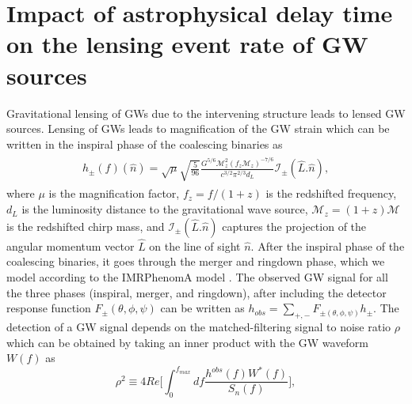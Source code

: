 \documentclass[a4paper,useAMS,usenatbib]{mnras}
\begin{document}
\section{Impact of astrophysical delay time on the lensing event rate of GW sources}
Gravitational lensing of GWs due to the intervening structure leads to lensed GW sources. Lensing of GWs leads to magnification of the GW strain which can be written  {in the inspiral phase of the coalescing binaries} as \citep{1987thyg.book.....H, Cutler:1994ys,Poisson:1995ef,maggiore2008gravitational}
\begin{align}\label{lens-1}
    \begin{split}
       h_{\pm}(f) (\hat n)= \sqrt{\mu}\sqrt{\frac{5}{96}}\frac{G^{5/6}\mathcal{M}_z^2 (f_z\mathcal{M}_z)^{-7/6}}{c^{3/2}\pi^{2/3}d_L}\mathcal{I}_{\pm} (\hat L.\hat n), 
           \end{split}
\end{align}
where $\mu$ is the magnification factor, $f_z= f/(1+z)$ is the redshifted frequency, $d_L$ is the luminosity distance to the gravitational wave source, $\mathcal{M}_z= (1+z)\mathcal{M}$ is the redshifted chirp mass, and  $\mathcal{I}_{\pm} (\hat L.\hat n)$ captures the projection of the angular momentum vector $\hat L$ on the line of sight $\hat n$.  {After the inspiral phase of the coalescing binaries, it goes through the merger and ringdown phase, which we model according to the IMRPhenomA model \citep{Ajith:2007kx}.} The observed GW signal  {for all the three phases (inspiral, merger, and ringdown),} after including the detector response function $F_{\pm} (\theta, \phi, \psi)$ can be written as $h_{obs}= \sum_{+,-} F_{\pm (\theta, \phi, \psi)} h_{\pm}$. The detection of a GW signal depends on the matched-filtering signal to noise ratio $\rho$ which can be obtained by taking an inner product with the GW waveform $W(f)$ as \citep{Sathyaprakash:1991mt, Cutler:1994ys,Balasubramanian:1995bm}
\begin{equation}\label{snrgw}
    \rho^2\equiv 4Re\bigg[\int_0^{f_{max}} df \frac{ h^{obs}(f)W^*(f)}{S_n(f)}\bigg],
\end{equation}
\end{document}

